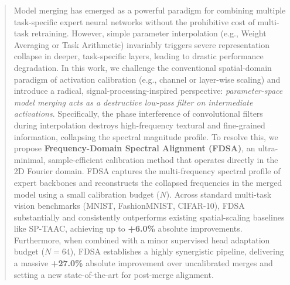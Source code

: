 \documentclass{article}
\begin{document}

\printAffiliationsAndNotice{\icmlEqualContribution}

\begin{abstract}
Model merging has emerged as a powerful paradigm for combining multiple task-specific expert neural networks without the prohibitive cost of multi-task retraining. However, simple parameter interpolation (e.g., Weight Averaging or Task Arithmetic) invariably triggers severe representation collapse in deeper, task-specific layers, leading to drastic performance degradation. In this work, we challenge the conventional spatial-domain paradigm of activation calibration (e.g., channel or layer-wise scaling) and introduce a radical, signal-processing-inspired perspective: \textit{parameter-space model merging acts as a destructive low-pass filter on intermediate activations}. Specifically, the phase interference of convolutional filters during interpolation destroys high-frequency textural and fine-grained information, collapsing the spectral magnitude profile. To resolve this, we propose \textbf{Frequency-Domain Spectral Alignment (FDSA)}, an ultra-minimal, sample-efficient calibration method that operates directly in the 2D Fourier domain. FDSA captures the multi-frequency spectral profile of expert backbones and reconstructs the collapsed frequencies in the merged model using a small calibration budget ($N$). Across standard multi-task vision benchmarks (MNIST, FashionMNIST, CIFAR-10), FDSA substantially and consistently outperforms existing spatial-scaling baselines like SP-TAAC, achieving up to \textbf{+6.0\%} absolute improvements. Furthermore, when combined with a minor supervised head adaptation budget ($N=64$), FDSA establishes a highly synergistic pipeline, delivering a massive \textbf{+27.0\%} absolute improvement over uncalibrated merges and setting a new state-of-the-art for post-merge alignment.
\end{abstract}
\end{document}

